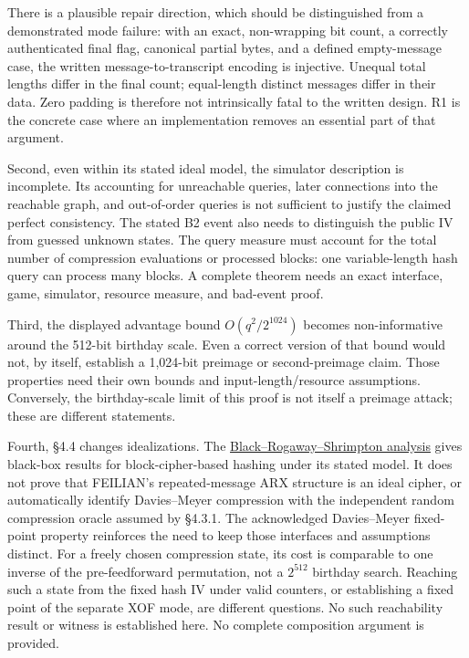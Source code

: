 \documentclass[
  english,
  11pt,
  a4paper,
]{article}
\begin{document}
There is a plausible repair direction, which should be distinguished
from a demonstrated mode failure: with an exact, non-wrapping bit count,
a correctly authenticated final flag, canonical partial bytes, and a
defined empty-message case, the written message-to-transcript encoding
is injective. Unequal total lengths differ in the final count;
equal-length distinct messages differ in their data. Zero padding is
therefore not intrinsically fatal to the written design. R1 is the
concrete case where an implementation removes an essential part of that
argument.

Second, even within its stated ideal model, the simulator description is
incomplete. Its accounting for unreachable queries, later connections
into the reachable graph, and out-of-order queries is not sufficient to
justify the claimed perfect consistency. The stated B2 event also needs
to distinguish the public IV from guessed unknown states. The query
measure must account for the total number of compression evaluations or
processed blocks: one variable-length hash query can process many
blocks. A complete theorem needs an exact interface, game, simulator,
resource measure, and bad-event proof.

Third, the displayed advantage bound \(O(q^2 / 2^{1024})\) becomes
non-informative around the 512-bit birthday scale. Even a correct
version of that bound would not, by itself, establish a 1,024-bit
preimage or second-preimage claim. Those properties need their own
bounds and input-length/resource assumptions. Conversely, the
birthday-scale limit of this proof is not itself a preimage attack;
these are different statements.

Fourth, §4.4 changes idealizations. The
\href{https://www.cs.ucdavis.edu/~rogaway/papers/hash.pdf}{Black--Rogaway--Shrimpton
analysis} gives black-box results for block-cipher-based hashing under
its stated model. It does not prove that FEILIAN's repeated-message ARX
structure is an ideal cipher, or automatically identify Davies--Meyer
compression with the independent random compression oracle assumed by
§4.3.1. The acknowledged Davies--Meyer fixed-point property reinforces
the need to keep those interfaces and assumptions distinct. For a freely
chosen compression state, its cost is comparable to one inverse of the
pre-feedforward permutation, not a \(2^{512}\) birthday search. Reaching
such a state from the fixed hash IV under valid counters, or
establishing a fixed point of the separate XOF mode, are different
questions. No such reachability result or witness is established here.
No complete composition argument is provided.
\end{document}
